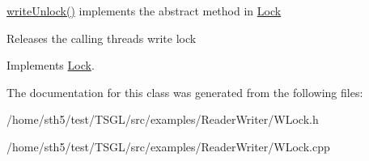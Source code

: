 \hyperlink{class_w_lock_a7070d23ba439b826e2310d9ffc65006e}{write\+Unlock()} implements the abstract method in \hyperlink{class_lock}{Lock} 

Releases the calling thread\textquotesingle{}s write lock 

Implements \hyperlink{class_lock}{Lock}.



The documentation for this class was generated from the following files\+:\begin{DoxyCompactItemize}
\item 
/home/sth5/test/\+T\+S\+G\+L/src/examples/\+Reader\+Writer/W\+Lock.\+h\item 
/home/sth5/test/\+T\+S\+G\+L/src/examples/\+Reader\+Writer/W\+Lock.\+cpp\end{DoxyCompactItemize}
